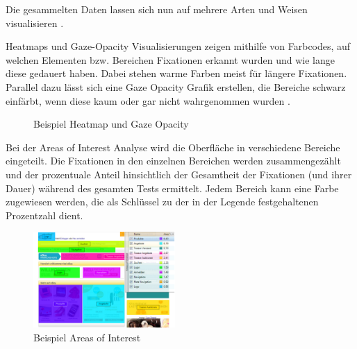 Die gesammelten Daten lassen sich nun auf mehrere Arten und Weisen visualisieren \cite{Henrici2010}.\par
Heatmaps und Gaze-Opacity Visualisierungen  zeigen mithilfe von Farbcodes, auf welchen Elementen bzw. Bereichen Fixationen erkannt wurden und wie lange diese gedauert haben. Dabei stehen warme Farben meist für längere Fixationen. Parallel dazu lässt sich eine Gaze Opacity Grafik erstellen, die Bereiche schwarz einfärbt, wenn diese kaum oder gar nicht wahrgenommen wurden \cite{Henrici2010}.
\begin{figure}[H] 
	\centering
	\hspace{1.0em}
	\caption{Beispiel Heatmap und Gaze Opacity \cite{Henrici2010}}
	\label{fig:heatmapGazeOpacity}
\end{figure}
Bei der Areas of Interest Analyse wird die Oberfläche in verschiedene Bereiche eingeteilt. Die Fixationen in den einzelnen Bereichen werden zusammengezählt und der prozentuale Anteil hinsichtlich der Gesamtheit der Fixationen (und ihrer Dauer) während des gesamten Tests ermittelt. Jedem Bereich kann eine Farbe zugewiesen werden, die als Schlüssel zu der in der Legende festgehaltenen Prozentzahl dient.
\begin{figure}[H]
 \centering
 \includegraphics[width=0.48\textwidth]{grafiken/areas_of_interest.png}
 \caption{Beispiel Areas of Interest \cite{Henrici2010}}
 \label{fig:areasOfInterest}
\end{figure}
